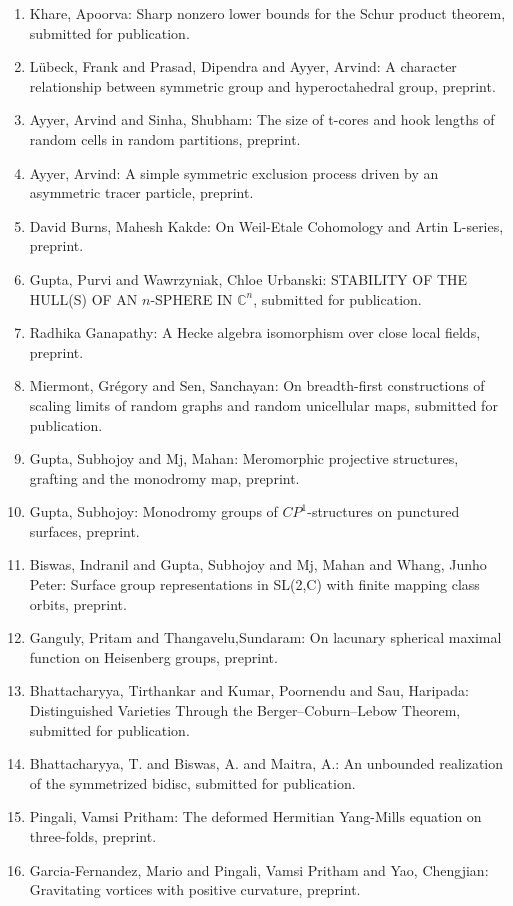 \begin{enumerate}
\item Khare, Apoorva: Sharp nonzero lower bounds for the Schur product theorem, submitted for publication.
\item Lübeck, Frank and Prasad, Dipendra and Ayyer, Arvind: A character relationship between symmetric group and hyperoctahedral group, preprint.
\item Ayyer, Arvind and Sinha, Shubham: The size of t-cores and hook lengths of random cells in random partitions, preprint.
\item Ayyer, Arvind: A simple symmetric exclusion process driven by an asymmetric tracer particle, preprint.
\item David Burns, Mahesh Kakde: On Weil-Etale Cohomology and Artin L-series, preprint.
\item Gupta, Purvi and Wawrzyniak, Chloe Urbanski: STABILITY OF THE HULL(S) OF AN $n$-SPHERE IN $\mathbb{C}^n$, submitted for publication.
\item Radhika Ganapathy: A Hecke algebra isomorphism over close local fields, preprint.
\item Miermont, Grégory and Sen, Sanchayan: On breadth-first constructions of scaling limits of random graphs and random unicellular maps, submitted for publication.
\item Gupta, Subhojoy and Mj, Mahan: Meromorphic projective structures, grafting and the monodromy map, preprint.
\item Gupta, Subhojoy: Monodromy groups of $CP^1$-structures on punctured surfaces, preprint.
\item Biswas, Indranil and Gupta, Subhojoy and Mj, Mahan and Whang, Junho Peter: Surface group representations in SL(2,C) with finite mapping class orbits, preprint.
\item Ganguly, Pritam and Thangavelu,Sundaram: On lacunary spherical maximal function on Heisenberg groups, preprint.
\item Bhattacharyya, Tirthankar and Kumar, Poornendu and Sau, Haripada: Distinguished Varieties Through the Berger--Coburn--Lebow Theorem, submitted for publication.
\item Bhattacharyya, T. and  Biswas, A. and Maitra, A.: An unbounded realization of the symmetrized bidisc, submitted for publication.
\item Pingali, Vamsi Pritham: The deformed Hermitian Yang-Mills equation on three-folds, preprint.
\item Garcia-Fernandez, Mario and Pingali, Vamsi Pritham and Yao, Chengjian: Gravitating vortices with positive curvature, preprint.

\end{enumerate}
